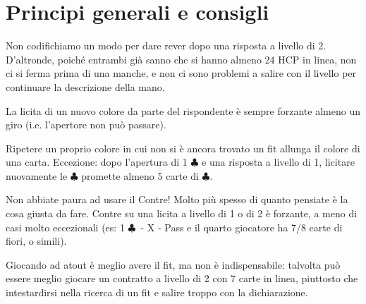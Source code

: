 \documentclass[a4paper,10pt]{article}
\renewcommand{\c}{$\clubsuit$\xspace}
\newcommand{\smallspace}{\vskip0.3cm}
\begin{document}
\pagebreak

\section{Principi generali e consigli}

\indent

Non codifichiamo un modo per dare rever dopo una risposta a livello di 2. D'altronde, poiché entrambi già sanno che si hanno almeno 24 HCP in linea, non ci si ferma prima di una manche, e non ci sono problemi a salire con il livello per continuare la descrizione della mano.

\smallspace

La licita di un nuovo colore da parte del rispondente è sempre forzante almeno un giro (i.e. l'apertore non può passare).

\smallspace

Ripetere un proprio colore in cui non si è ancora trovato un fit allunga il colore di una carta. Eccezione: dopo l'apertura di 1 \c e una risposta a livello di 1, licitare nuovamente le \c promette almeno 5 carte di \c.

\smallspace

Non abbiate paura ad usare il Contre! Molto più spesso di quanto pensiate è la cosa giusta da fare. Contre su una licita a livello di 1 o di 2 è forzante, a meno di casi molto eccezionali (es: 1 \c\ - X - Pass e il quarto giocatore ha 7/8 carte di fiori, o simili).

\smallspace

Giocando ad atout è meglio avere il fit, ma non è indispensabile: talvolta può essere meglio giocare un contratto a livello di 2 con 7 carte in linea, piuttosto che intestardirsi nella ricerca di un fit e salire troppo con la dichiarazione.
\end{document}
